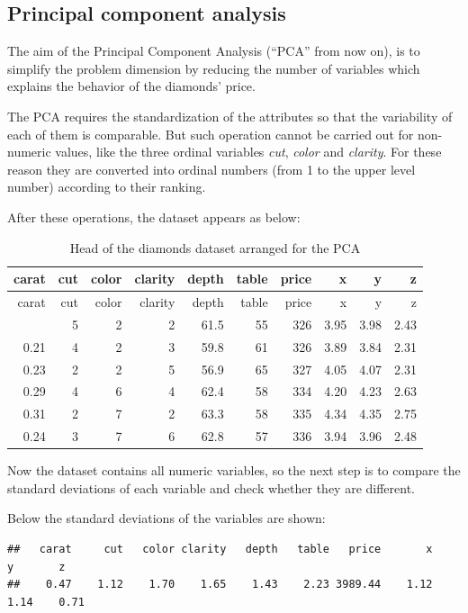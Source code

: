 \documentclass[
]{article}
\begin{document}
\hypertarget{principal-component-analysis}{%
\subsection{Principal component
analysis}\label{principal-component-analysis}}

The aim of the Principal Component Analysis (``PCA'' from now on), is to
simplify the problem dimension by reducing the number of variables which
explains the behavior of the diamonds' price.

The PCA requires the standardization of the attributes so that the
variability of each of them is comparable. But such operation cannot be
carried out for non-numeric values, like the three ordinal variables
\emph{cut}, \emph{color} and \emph{clarity}. For these reason they are
converted into ordinal numbers (from 1 to the upper level number)
according to their ranking.

After these operations, the dataset appears as below:

\begin{longtable}[]{@{}rrrrrrrrrr@{}}
\caption{Head of the diamonds dataset arranged for the
PCA}\tabularnewline
\toprule\noalign{}
carat & cut & color & clarity & depth & table & price & x & y & z \\
\midrule\noalign{}
\endfirsthead
\toprule\noalign{}
carat & cut & color & clarity & depth & table & price & x & y & z \\
\midrule\noalign{}
\endhead
\bottomrule\noalign{}
\endlastfoot
0.23 & 5 & 2 & 2 & 61.5 & 55 & 326 & 3.95 & 3.98 & 2.43 \\
0.21 & 4 & 2 & 3 & 59.8 & 61 & 326 & 3.89 & 3.84 & 2.31 \\
0.23 & 2 & 2 & 5 & 56.9 & 65 & 327 & 4.05 & 4.07 & 2.31 \\
0.29 & 4 & 6 & 4 & 62.4 & 58 & 334 & 4.20 & 4.23 & 2.63 \\
0.31 & 2 & 7 & 2 & 63.3 & 58 & 335 & 4.34 & 4.35 & 2.75 \\
0.24 & 3 & 7 & 6 & 62.8 & 57 & 336 & 3.94 & 3.96 & 2.48 \\
\end{longtable}

Now the dataset contains all numeric variables, so the next step is to
compare the standard deviations of each variable and check whether they
are different.

Below the standard deviations of the variables are shown:

\begin{verbatim}
##   carat     cut   color clarity   depth   table   price       x       y       z 
##    0.47    1.12    1.70    1.65    1.43    2.23 3989.44    1.12    1.14    0.71
\end{verbatim}
\end{document}

